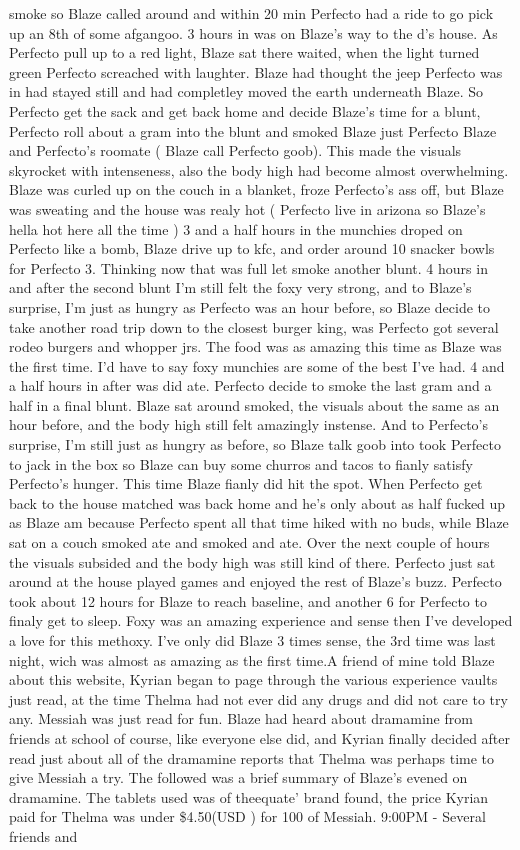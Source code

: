 \documentclass[12pt]{book}
\begin{document}
smoke so Blaze called around and within 20 min Perfecto had a ride to go pick up an 8th of some afgangoo. 3 hours in was on Blaze's way to the d's house. As Perfecto pull up to a red light, Blaze sat there waited, when the light turned green Perfecto screached with laughter. Blaze had thought the jeep Perfecto was in had stayed still and had completley moved the earth underneath Blaze. So Perfecto get the sack and get back home and decide Blaze's time for a blunt, Perfecto roll about a gram into the blunt and smoked Blaze just Perfecto Blaze and Perfecto's roomate ( Blaze call Perfecto goob). This made the visuals skyrocket with intenseness, also the body high had become almost overwhelming. Blaze was curled up on the couch in a blanket, froze Perfecto's ass off, but Blaze was sweating and the house was realy hot ( Perfecto live in arizona so Blaze's hella hot here all the time ) 3 and a half hours in the munchies droped on Perfecto like a bomb, Blaze drive up to kfc, and order around 10 snacker bowls for Perfecto 3. Thinking now that was full let smoke another blunt. 4 hours in and after the second blunt I'm still felt the foxy very strong, and to Blaze's surprise, I'm just as hungry as Perfecto was an hour before, so Blaze decide to take another road trip down to the closest burger king, was Perfecto got several rodeo burgers and whopper jrs. The food was as amazing this time as Blaze was the first time. I'd have to say foxy munchies are some of the best I've had. 4 and a half hours in after was did ate. Perfecto decide to smoke the last gram and a half in a final blunt. Blaze sat around smoked, the visuals about the same as an hour before, and the body high still felt amazingly instense. And to Perfecto's surprise, I'm still just as hungry as before, so Blaze talk goob into took Perfecto to jack in the box so Blaze can buy some churros and tacos to fianly satisfy Perfecto's hunger. This time Blaze fianly did hit the spot. When Perfecto get back to the house matched was back home and he's only about as half fucked up as Blaze am because Perfecto spent all that time hiked with no buds, while Blaze sat on a couch smoked ate and smoked and ate. Over the next couple of hours the visuals subsided and the body high was still kind of there. Perfecto just sat around at the house played games and enjoyed the rest of Blaze's buzz. Perfecto took about 12 hours for Blaze to reach baseline, and another 6 for Perfecto to finaly get to sleep. Foxy was an amazing experience and sense then I've developed a love for this methoxy. I've only did Blaze 3 times sense, the 3rd time was last night, wich was almost as amazing as the first time.A friend of mine told Blaze about this website, Kyrian began to page through the various experience vaults just read, at the time Thelma had not ever did any drugs and did not care to try any. Messiah was just read for fun. Blaze had heard about dramamine from friends at school of course, like everyone else did, and Kyrian finally decided after read just about all of the dramamine reports that Thelma was perhaps time to give Messiah a try. The followed was a brief summary of Blaze's evened on dramamine. The tablets used was of theequate' brand found, the price Kyrian paid for Thelma was under \$4.50(USD ) for 100 of Messiah. 9:00PM - Several friends and 
\end{document}
